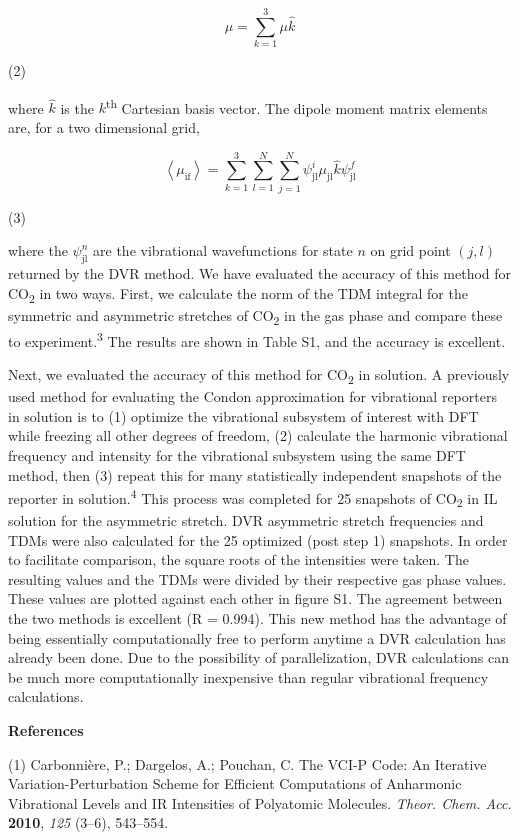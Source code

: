 \documentclass[]{article}
\begin{document}
\[\overset{}{\mu} = \sum_{k = 1}^{3}{\overset{}{\mu}\widehat{k}}\]

(2)

where \(\widehat{k}\) is the \(k\)\textsuperscript{th} Cartesian basis
vector. The dipole moment matrix elements are, for a two dimensional
grid,

\[\left\langle {\overset{}{\mu}}_{\text{if}} \right\rangle = \sum_{k = 1}^{3}{\sum_{l = 1}^{N}{\sum_{j = 1}^{N}{\psi_{\text{jl}}^{i}{\overset{}{\mu}}_{\text{jl}}\widehat{k}\psi_{\text{jl}}^{f}}}}\]

(3)

where the \(\psi_{\text{jl}}^{n}\) are the vibrational wavefunctions for
state \(n\) on grid point \((j,l)\) returned by the DVR method. We have
evaluated the accuracy of this method for CO\textsubscript{2} in two
ways. First, we calculate the norm of the TDM integral for the symmetric
and asymmetric stretches of CO\textsubscript{2} in the gas phase and
compare these to experiment.\textsuperscript{3} The results are shown in
Table S1, and the accuracy is excellent.

Next, we evaluated the accuracy of this method for CO\textsubscript{2}
in solution. A previously used method for evaluating the Condon
approximation for vibrational reporters in solution is to (1) optimize
the vibrational subsystem of interest with DFT while freezing all other
degrees of freedom, (2) calculate the harmonic vibrational frequency and
intensity for the vibrational subsystem using the same DFT method, then
(3) repeat this for many statistically independent snapshots of the
reporter in solution.\textsuperscript{4} This process was completed for
25 snapshots of CO\textsubscript{2} in IL solution for the asymmetric
stretch. DVR asymmetric stretch frequencies and TDMs were also
calculated for the 25 optimized (post step 1) snapshots. In order to
facilitate comparison, the square roots of the intensities were taken.
The resulting values and the TDMs were divided by their respective gas
phase values. These values are plotted against each other in figure S1.
The agreement between the two methods is excellent (R = 0.994). This new
method has the advantage of being essentially computationally free to
perform anytime a DVR calculation has already been done. Due to the
possibility of parallelization, DVR calculations can be much more
computationally inexpensive than regular vibrational frequency
calculations.

\textbf{References}

(1) Carbonnière, P.; Dargelos, A.; Pouchan, C. The VCI-P Code: An
Iterative Variation-Perturbation Scheme for Efficient Computations of
Anharmonic Vibrational Levels and IR Intensities of Polyatomic
Molecules. \emph{Theor. Chem. Acc.} \textbf{2010}, \emph{125} (3--6),
543--554.
\end{document}
